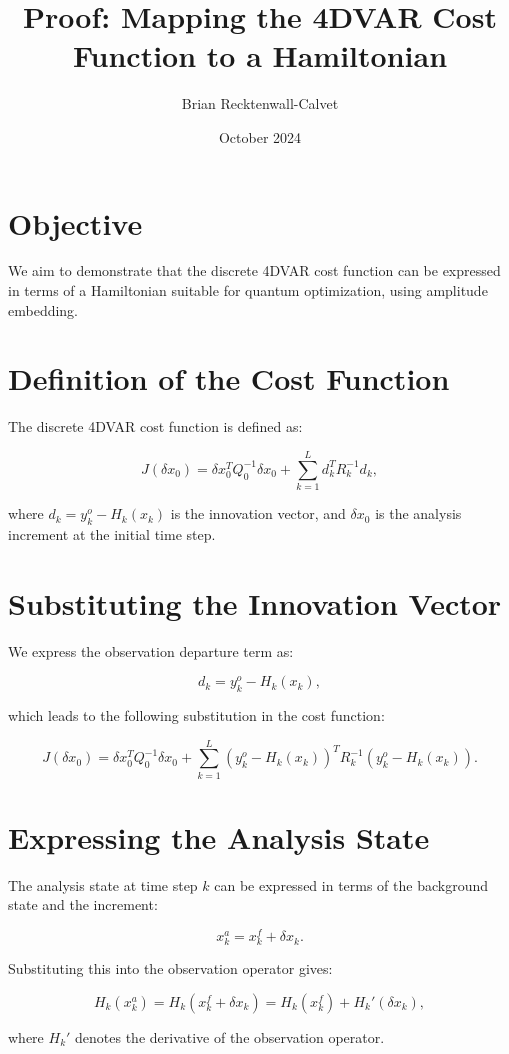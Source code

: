 \documentclass{article}
\begin{document}
\title{Proof: Mapping the 4DVAR Cost Function to a Hamiltonian}
\author{Brian Recktenwall-Calvet}
\date{October 2024}
\maketitle

\section*{Objective}
We aim to demonstrate that the discrete 4DVAR cost function can be expressed in terms of a Hamiltonian suitable for quantum optimization, using amplitude embedding.

\section{Definition of the Cost Function}
The discrete 4DVAR cost function is defined as:

\[
J(\delta x_0) = \delta x_0^T Q_0^{-1} \delta x_0 + \sum_{k=1}^{L} d_k^T R_k^{-1} d_k,
\]

where \( d_k = y_k^o - H_k(x_k) \) is the innovation vector, and \( \delta x_0 \) is the analysis increment at the initial time step.

\section{Substituting the Innovation Vector}
We express the observation departure term as:

\[
d_k = y_k^o - H_k(x_k),
\]

which leads to the following substitution in the cost function:

\[
J(\delta x_0) = \delta x_0^T Q_0^{-1} \delta x_0 + \sum_{k=1}^{L} (y_k^o - H_k(x_k))^T R_k^{-1} (y_k^o - H_k(x_k)).
\]

\section{Expressing the Analysis State}
The analysis state at time step \( k \) can be expressed in terms of the background state and the increment:

\[
x^a_k = x^f_k + \delta x_k.
\]

Substituting this into the observation operator gives:

\[
H_k(x^a_k) = H_k(x^f_k + \delta x_k) = H_k(x^f_k) + H_k'(\delta x_k),
\]

where \( H_k' \) denotes the derivative of the observation operator.
\end{document}
